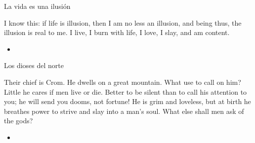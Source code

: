 \begin{frame}{La vida es una ilusión}
	\begin{exampleblock}{}
		 I know this: if life is illusion, then I am no less an illusion, and being thus, the illusion is real to me. I live, I burn with life, I love, I slay, and am content.
	\end{exampleblock}

	\begin{itemize}
		\item \textit{  }
	\end{itemize}
\end{frame}
\note[itemize]{
	\item
}

\begin{frame}{Los dioses del norte}
	\begin{exampleblock}{}
		Their chief is Crom. He dwells on a great mountain. What use to call on him? Little he cares if men live or die. Better to be silent than to call his attention to you; he will send you dooms, not fortune! He is grim and loveless, but at birth he breathes power to strive and slay into a man’s soul. What else shall men ask of the gods?
	\end{exampleblock}

	\begin{itemize}
		\item \textit{  }
	\end{itemize}
\end{frame}
\note[itemize]{
	\item
}

